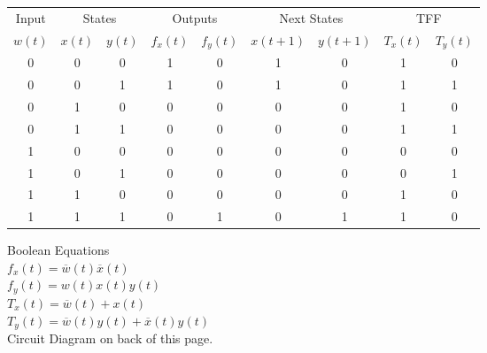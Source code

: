 \documentclass[a4paper]{article}
\begin{document}
\begin{enumerate}
      \begin{tabular}{ ccc|cc|cc|cc }
        Input & \multicolumn{2}{c}{States} & \multicolumn{2}{c}{Outputs} & \multicolumn{2}{c}{Next States} & \multicolumn{2}{c}{TFF}\\
        $w(t)$ & $x(t)$ & $y(t)$ & $f_{x}(t)$ & $f_{y}(t)$ & $x(t+1)$ & $y(t+1)$ & $T_{x}(t)$ & $T_{y}(t)$ \\ \hline
        0 & 0 & 0 & 1 & 0 & 1 & 0 & 1 & 0\\
        0 & 0 & 1 & 1 & 0 & 1 & 0 & 1 & 1\\
        0 & 1 & 0 & 0 & 0 & 0 & 0 & 1 & 0\\
        0 & 1 & 1 & 0 & 0 & 0 & 0 & 1 & 1\\ \hline
        1 & 0 & 0 & 0 & 0 & 0 & 0 & 0 & 0\\
        1 & 0 & 1 & 0 & 0 & 0 & 0 & 0 & 1\\
        1 & 1 & 0 & 0 & 0 & 0 & 0 & 1 & 0\\
        1 & 1 & 1 & 0 & 1 & 0 & 1 & 1 & 0\\
      \end{tabular}

      \vspace{0.5cm}
      Boolean Equations \\

      $f_{x}(t) = \overline{w}(t)\overline{x}(t)$ \\
      $f_{y}(t) = w(t)x(t)y(t)$ \\
      $T_{x}(t) = \overline{w}(t) + x(t)$ \\
      $T_{y}(t) = \overline{w}(t)y(t) + \overline{x}(t)y(t)$ \\

      \vspace{1cm}
      Circuit Diagram on back of this page.


    \end{enumerate}
\end{document}
